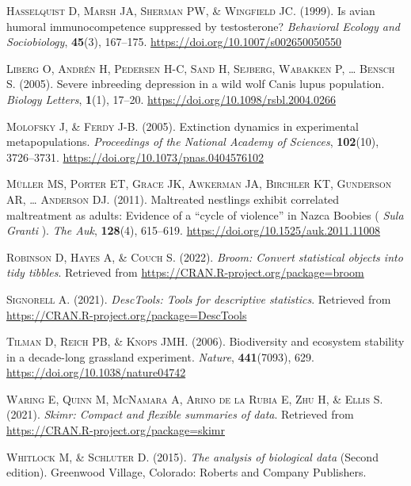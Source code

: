\documentclass[
  a4paper,
]{article}
\begin{document}
\leavevmode\hypertarget{ref-Hasselquist1999}{}%
\textsc{Hasselquist D, Marsh JA, Sherman PW, \& Wingfield JC}. (1999). Is avian humoral immunocompetence suppressed by testosterone? \emph{Behavioral Ecology and Sociobiology}, \textbf{45}(3), 167--175. \url{https://doi.org/10.1007/s002650050550}

\leavevmode\hypertarget{ref-liberg2005}{}%
\textsc{Liberg O, Andrén H, Pedersen H-C, Sand H, Sejberg, Wabakken P, \ldots{} Bensch S}. (2005). Severe inbreeding depression in a wild wolf Canis lupus population. \emph{Biology Letters}, \textbf{1}(1), 17--20. \url{https://doi.org/10.1098/rsbl.2004.0266}

\leavevmode\hypertarget{ref-Molofsky2005}{}%
\textsc{Molofsky J, \& Ferdy J-B}. (2005). Extinction dynamics in experimental metapopulations. \emph{Proceedings of the National Academy of Sciences}, \textbf{102}(10), 3726--3731. \url{https://doi.org/10.1073/pnas.0404576102}

\leavevmode\hypertarget{ref-muller2011}{}%
\textsc{Müller MS, Porter ET, Grace JK, Awkerman JA, Birchler KT, Gunderson AR, \ldots{} Anderson DJ}. (2011). Maltreated nestlings exhibit correlated maltreatment as adults: Evidence of a ``cycle of violence'' in Nazca Boobies ( \emph{Sula} \emph{Granti} ). \emph{The Auk}, \textbf{128}(4), 615--619. \url{https://doi.org/10.1525/auk.2011.11008}

\leavevmode\hypertarget{ref-R-broom}{}%
\textsc{Robinson D, Hayes A, \& Couch S}. (2022). \emph{Broom: Convert statistical objects into tidy tibbles}. Retrieved from \url{https://CRAN.R-project.org/package=broom}

\leavevmode\hypertarget{ref-R-DescTools}{}%
\textsc{Signorell A}. (2021). \emph{DescTools: Tools for descriptive statistics}. Retrieved from \url{https://CRAN.R-project.org/package=DescTools}

\leavevmode\hypertarget{ref-tilman2006}{}%
\textsc{Tilman D, Reich PB, \& Knops JMH}. (2006). Biodiversity and ecosystem stability in a decade-long grassland experiment. \emph{Nature}, \textbf{441}(7093), 629. \url{https://doi.org/10.1038/nature04742}

\leavevmode\hypertarget{ref-R-skimr}{}%
\textsc{Waring E, Quinn M, McNamara A, Arino de la Rubia E, Zhu H, \& Ellis S}. (2021). \emph{Skimr: Compact and flexible summaries of data}. Retrieved from \url{https://CRAN.R-project.org/package=skimr}

\leavevmode\hypertarget{ref-whitlock2015}{}%
\textsc{Whitlock M, \& Schluter D}. (2015). \emph{The analysis of biological data} (Second edition). Greenwood Village, Colorado: Roberts and Company Publishers.
\end{document}
